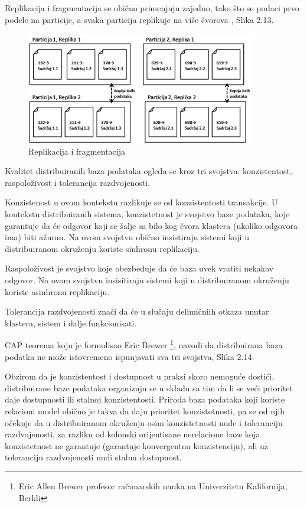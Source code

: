 \documentclass[12pt,oneside]{memoir}
\begin{document}
\pagebreak
Replikacija i fragmentacija se obično primenjuju zajedno, tako što se podaci prvo podele na particije, a svaka particija replikuje na više čvorova \cite{ColumnarOriented}, Slika 2.13. 

\begin{figure}[!ht]
  \centering
  \includegraphics[width=0.9\textwidth]{replica-partition.png}
  \caption{Replikacija i fragmentacija}
  \label{fig:grafikon}
\end{figure}

Kvalitet distribuiranih baza podataka ogleda se kroz tri svojstva: konzistentost, raspoloživost i tolerancija razdvojenosti.

Konzistenost u ovom kontekstu razlikuje se od konzistentosti transakcije. U kontekstu distribuiranih sistema, konzistetnost je svojstvo baze podataka, koje garantuje da će odgovor koji se šalje sa bilo kog čvora klastera (ukoliko odgovora ima) biti ažuran. Na ovom svojstvu obično insistiraju sistemi koji u distribuiranom okruženju koriste sinhronu replikaciju.

Raspoloživost je svojstvo koje obezbeđuje da će baza uvek vratiti nekakav odgovor. Na ovom svojstvu insisitiraju sistemi koji u distribuiranom okruženju koriste asinhronu replikaciju.

Tolerancija razdvojenosti znači da će u slučaju delimičniih otkaza unutar klastera, sistem i dalje funkcionisati.

CAP teorema koju je formulisao Eric Brewer \footnote{Eric Allen Brewer profesor računarskih nauka na Univerzitetu Kalifornija, Berkli}, navodi da distribuirana baza podatka ne može istovremeno ispunjavati sva tri svojstva, Slika 2.14.

Obzirom da je konzistentost i dostupnost u praksi skoro nemoguće dostići, distribuirane baze podataka organizuju se u skladu sa tim da li se veći prioritet daje dostupnosti ili stalnoj konzistentosti. Priroda baza podataka koji koriste relacioni model obično je takva da daju prioritet konzistetnosti, pa se od njih očekuje da u distribuiranom okruženju osim konzistetnosti nude i toleranciju razdvojenosti, za razliku od kolonski orijentisane nerelacione baze koja konzistetnost ne garantuje (garantuje konvergentnu konzistenciju), ali uz toleranciju razdvojenosti nudi stalnu dostupnost.
\end{document}
